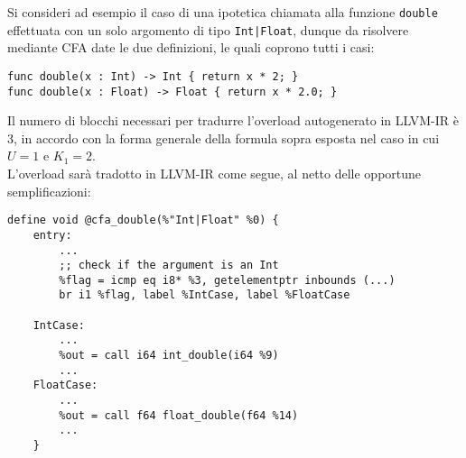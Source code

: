 Si consideri ad esempio il caso di una ipotetica chiamata alla funzione \texttt{double} 
effettuata con un solo argomento di tipo \texttt{Int|Float}, dunque da risolvere 
mediante CFA date le due definizioni, le quali coprono tutti i casi: 

\vspace{0.5cm}
\begin{lstlisting}[frame=single]
func double(x : Int) -> Int { return x * 2; }
func double(x : Float) -> Float { return x * 2.0; }
\end{lstlisting}
\vspace{0.5cm}

Il numero di blocchi necessari per tradurre l'overload autogenerato in LLVM-IR è 
3, in accordo con la forma generale della formula sopra esposta nel 
caso in cui $U = 1$ e $K_1 = 2$. \\

L'overload sarà tradotto in LLVM-IR come segue, al netto delle opportune semplificazioni: \\

\vspace{0.5cm}
\begin{lstlisting}[frame=single]
define void @cfa_double(%"Int|Float" %0) {
    entry:
        ...
        ;; check if the argument is an Int
        %flag = icmp eq i8* %3, getelementptr inbounds (...)
        br i1 %flag, label %IntCase, label %FloatCase
    
    IntCase:
        ...
        %out = call i64 int_double(i64 %9)
        ...
    FloatCase:
        ...
        %out = call f64 float_double(f64 %14)
        ...
    }
\end{lstlisting}
\vspace{0.5cm}